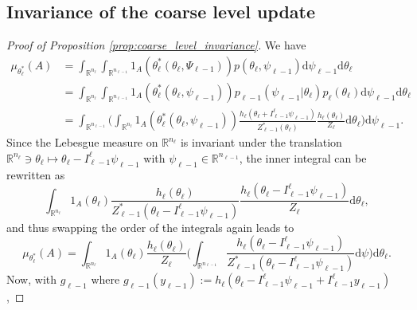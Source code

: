 \documentclass[11pt,english]{article}
\theoremstyle{plain}
\theoremstyle{plain}
\theoremstyle{plain}
\theoremstyle{plain}
\numberwithin{equation}{section}
\begin{document}
\subsection{Invariance of the coarse level update}\label{sec:proof_MGMC_coarse_level_invariance}
\begin{proof}[Proof of Proposition \ref{prop:coarse_level_invariance}]
	We have
	\begin{align*}
		\mu_{\theta_\ell^{*}}(A) & =\int_{\mathbb{R}^{n_{\ell}}}\int_{\mathbb{R}^{n_{\ell-1}}}1_{A}(\theta_\ell^{*}(\theta_\ell,\Psi_{\ell-1}))p(\theta_\ell,\psi_{\ell-1})\mathrm{d}\psi_{\ell-1}\mathrm{d}\theta_\ell                                                                                                              \\
		                         & =\int_{\mathbb{R}^{n_{\ell}}}\int_{\mathbb{R}^{n_{\ell-1}}}1_{A}(\theta_\ell^{*}(\theta_\ell,\psi_{\ell-1}))p_{\ell-1}(\psi_{\ell-1}|\theta_\ell)p_{\ell}(\theta_\ell)\mathrm{d}\psi_{\ell-1}\mathrm{d}\theta_\ell                                                                                \\
		                         & =\int_{\mathbb{R}^{n_{\ell-1}}}\Biggl(\int_{\mathbb{R}^{n_{\ell}}}1_{A}(\theta_\ell^{*}(\theta_\ell,\psi_{\ell-1}))\frac{h_{\ell}(\theta_\ell+I_{\ell-1}^\ell\psi_{\ell-1})}{Z^*_{\ell-1}(\theta_\ell)}\frac{h_{\ell}(\theta_\ell)}{Z_{\ell}}\mathrm{d}\theta_\ell\Biggr)\mathrm{d}\psi_{\ell-1}.
	\end{align*}
	Since the Lebesgue measure on $\mathbb{R}^{n_{\ell}}$ is invariant
	under the translation $\mathbb{R}^{n_{\ell}}\ni\theta_\ell\mapsto\theta_\ell-I_{\ell-1}^\ell\psi_{\ell-1}$ with $\psi_{\ell-1}\in\mathbb{R}^{n_{\ell-1}}$,
	the inner integral can be rewritten as
	\[
		\int_{\mathbb{R}^{n_{\ell}}}1_{A}(\theta_\ell)\frac{h_{\ell}(\theta_\ell)}{Z^*_{\ell-1}(\theta_\ell-I_{\ell-1}^\ell\psi_{\ell-1})}\frac{h_{\ell}(\theta_\ell-I_{\ell-1}^\ell\psi_{\ell-1})}{Z_\ell}\mathrm{d}\theta_\ell,
	\]
	and thus swapping the order of the integrals again leads to
	\begin{equation}
		\mu_{\theta_\ell^{*}}(A)=\int_{\mathbb{R}^{n_{\ell}}}1_{A}(\theta_\ell)\frac{h_{\ell}(\theta_\ell)}{Z_\ell}\biggl(\int_{\mathbb{R}^{n_{\ell-1}}}\frac{h_{\ell}(\theta_\ell-I_{\ell-1}^\ell\psi_{\ell-1})}{Z^*_{\ell-1}(\theta_\ell-I_{\ell-1}^\ell\psi_{\ell-1})}\mathrm{d}\psi\biggr)\mathrm{d}\theta_\ell.\label{eqn:integral_invariance}
	\end{equation}
	Now, with $g_{\ell-1}$ where $g_{\ell-1}(y_{\ell-1}):=h_{\ell}(\theta_\ell-I_{\ell-1}^\ell\psi_{\ell-1}+I_{\ell-1}^\ell y_{\ell-1})$,

\end{proof}
\end{document}
